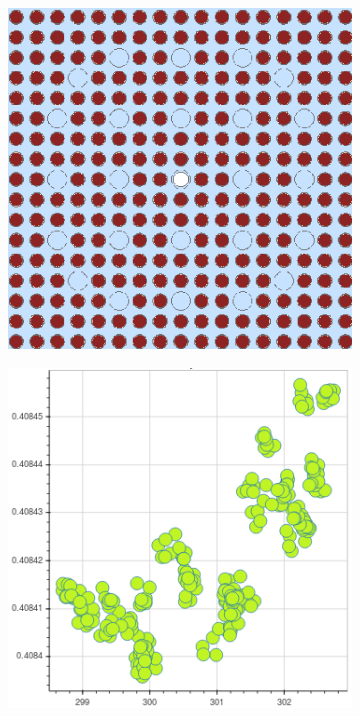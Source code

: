 \begin{figure}[h!]
\centering
\begin{subfigure}{0.42\textwidth}
  \centering
  \includegraphics[width=0.9\linewidth]{figures/unsupervised/features/assm-16/geometry}
  \caption{}
  \label{fig:chap10-fiss-mean-spect-ind-geom}
\end{subfigure}%
\begin{subfigure}{0.45\textwidth}
  \centering
  \includegraphics[width=0.9\linewidth]{figures/unsupervised/features/assm-16/u235-fiss/mean-spect-ind/mgxs}

\end{subfigure}
\end{figure}
